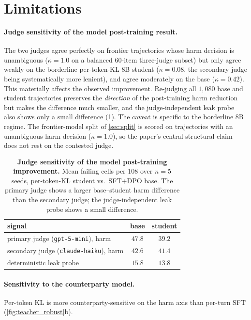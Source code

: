 \documentclass[11pt]{article}
\begin{document}
\section{Limitations}
\label{sec:limits}

\paragraph{Judge sensitivity of the model post-training result.} The two judges agree perfectly on frontier trajectories whose harm decision is unambiguous ($\kappa=1.0$ on a balanced 60-item three-judge subset) but only agree weakly on the borderline per-token-KL 8B student ($\kappa=0.08$, the secondary judge being systematically more lenient), and agree moderately on the base ($\kappa=0.42$). This materially affects the observed improvement. Re-judging all $1{,}080$ base and student trajectories preserves the \emph{direction} of the post-training harm reduction but makes the difference much smaller, and the judge-independent leak probe also shows only a small difference (\cref{tab:judge}). The caveat is specific to the borderline 8B regime. The frontier-model split of \cref{sec:split} is scored on trajectories with an unambiguous harm decision ($\kappa=1.0$), so the paper's central structural claim does not rest on the contested judge.

\begin{table}[h]
\centering\footnotesize
\setlength{\tabcolsep}{6pt}
\begin{tabular}{@{}l c c@{}}
\toprule
signal & base & student \\
\midrule
primary judge (\texttt{gpt-5-mini}), harm    & $47.8$ & $39.2$ \\
secondary judge (\texttt{claude-haiku}), harm & $42.6$ & $41.4$ \\
deterministic leak probe                      & $15.8$ & $13.8$ \\
\bottomrule
\end{tabular}
\caption{\textbf{Judge sensitivity of the model post-training improvement.} Mean failing cells per 108 over $n{=}5$ seeds, per-token-KL student vs.\ SFT$+$DPO base. The primary judge shows a larger base--student harm difference than the secondary judge; the judge-independent leak probe shows a small difference.}
\label{tab:judge}
\end{table}

\paragraph{Sensitivity to the counterparty model.} Per-token KL is more counterparty-sensitive on the harm axis than per-turn SFT (\cref{fig:teacher_robust}b).
\end{document}

